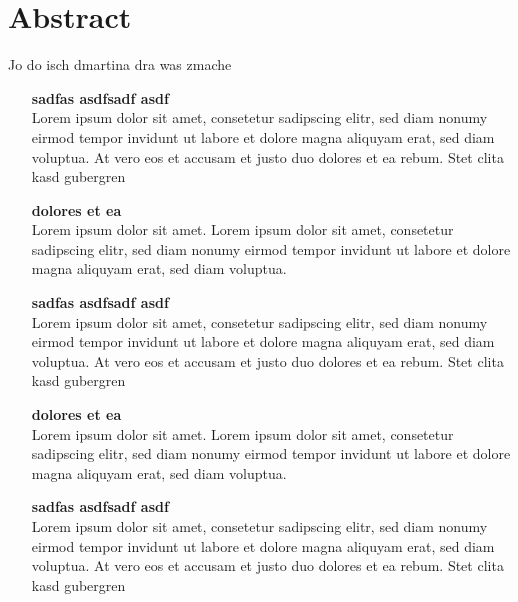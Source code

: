 \chapter*{Abstract}
\thispagestyle{empty}
Jo do isch dmartina dra was zmache
\begin{itemize}

\item[\textsf{\textbf{\large sadfas asdfsadf asdf}}] \quad \\
Lorem ipsum dolor sit amet, consetetur sadipscing elitr, sed diam nonumy eirmod tempor invidunt ut labore et dolore magna aliquyam erat, sed diam voluptua. At vero eos et accusam et justo duo dolores et ea rebum. Stet clita kasd gubergren

\item[\textsf{\textbf{\large dolores et ea}}] \quad \\
Lorem ipsum dolor sit amet. Lorem ipsum dolor sit amet, consetetur sadipscing elitr, sed diam nonumy eirmod tempor invidunt ut labore et dolore magna aliquyam erat, sed diam voluptua.

\item[\textsf{\textbf{\large sadfas asdfsadf asdf}}] \quad \\
Lorem ipsum dolor sit amet, consetetur sadipscing elitr, sed diam nonumy eirmod tempor invidunt ut labore et dolore magna aliquyam erat, sed diam voluptua. At vero eos et accusam et justo duo dolores et ea rebum. Stet clita kasd gubergren

\item[\textsf{\textbf{\large dolores et ea}}] \quad \\
Lorem ipsum dolor sit amet. Lorem ipsum dolor sit amet, consetetur sadipscing elitr, sed diam nonumy eirmod tempor invidunt ut labore et dolore magna aliquyam erat, sed diam voluptua.

\item[\textsf{\textbf{\large sadfas asdfsadf asdf}}] \quad \\
Lorem ipsum dolor sit amet, consetetur sadipscing elitr, sed diam nonumy eirmod tempor invidunt ut labore et dolore magna aliquyam erat, sed diam voluptua. At vero eos et accusam et justo duo dolores et ea rebum. Stet clita kasd gubergren

\end{itemize}


\newpage								
\thispagestyle{empty}
\mbox{}